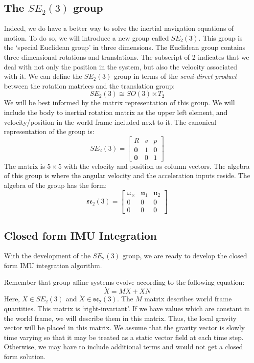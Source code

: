 \subsection{The $SE_2(3)$ group}
Indeed, we do have a better way to solve the inertial navigation equations of motion. To do so, we will introduce a new group called $SE_2(3)$. This group is the `special Euclidean group' in three dimensions. The Euclidean group contains three dimensional rotations and translations. The subscript of 2 indicates that we deal with not only the position in the system, but also the velocity associated with it. We can define the $SE_2(3)$ group in terms of the \textit{semi-direct product} between the rotation matrices and the translation group:
$$SE_2(3)\cong SO(3)\ltimes T_2$$
We will be best informed by the matrix representation of this group. We will include the body to inertial rotation matrix as the upper left element, and velocity/position in the world frame included next to it. The canonical representation of the group is:
$$SE_2(3)=\begin{bmatrix}
    R&v&p\\\bm{0}&1&0\\\bm{0}&0&1
\end{bmatrix}$$
The matrix is $5\times 5$ with the velocity and position as column vectors. The algebra of this group is where the angular velocity and the acceleration inputs reside. The algebra of the group has the form:
$$\mathfrak{se}_2(3)=\begin{bmatrix}
    \omega_\times&\bm{u}_1&\bm{u}_2\\
    0&0&0\\0&0&0
\end{bmatrix}$$

\subsection{Closed form IMU Integration}
With the development of the $SE_2(3)$ group, we are ready to develop the closed form IMU integration algorithm. 


Remember that group-affine systems evolve according to the following equation:
$$\dot{X}=MX+XN$$
Here, $X\in SE_2(3)$ and $\dot{X}\in\mathfrak{se}_2(3)$. The $M$ matrix describes world frame quantities. This matrix is `right-invariant'. If we have values which are constant in the world frame, we will describe them in this matrix. Thus, the local gravity vector will be placed in this matrix. We assume that the gravity vector is slowly time varying so that it may be treated as a static vector field at each time step. Otherwise, we may have to include additional terms and would not get a closed form solution.

